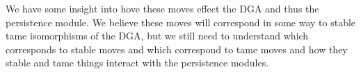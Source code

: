 \documentclass[11pt,oneside]{amsart}
\begin{document}
We have some insight into hove these moves effect the DGA and thus the persistence module. We believe these moves will correspond in some way to stable tame isomorphisms of the DGA, but we still need to understand which corresponds to stable moves and which correspond to tame moves and how they stable and tame things interact with the persistence modules.
\end{document}
